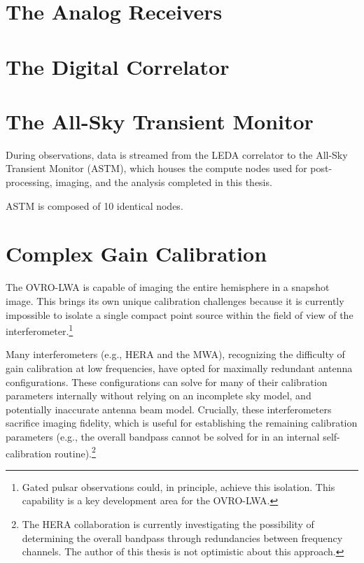 \begin{bibunit}
\section{The Analog Receivers}







\section{The Digital Correlator}



\section{The All-Sky Transient Monitor}

During observations, data is streamed from the LEDA correlator to the All-Sky Transient Monitor
(ASTM), which houses the compute nodes used for post-processing, imaging, and the analysis completed
in this thesis.

ASTM is composed of 10 identical nodes.





\section{Complex Gain Calibration}

The OVRO-LWA is capable of imaging the entire hemisphere in a snapshot image. This brings its own
unique calibration challenges because it is currently impossible to isolate a single compact point source
within the field of view of the interferometer.\footnote{
    Gated pulsar observations could, in principle, achieve this isolation. This capability is a key
    development area for the OVRO-LWA.
}

Many interferometers (e.g., HERA and the MWA), recognizing the difficulty of gain calibration at low
frequencies, have opted for maximally redundant antenna configurations. These configurations can
solve for many of their calibration parameters internally without relying on an incomplete sky
model, and potentially inaccurate antenna beam model. Crucially, these interferometers sacrifice
imaging fidelity, which is useful for establishing the remaining calibration parameters (e.g., the
overall bandpass cannot be solved for in an internal self-calibration routine).\footnote{
    The HERA collaboration is currently investigating the possibility of determining the overall
    bandpass through redundancies between frequency channels. The author of this thesis is not
    optimistic about this approach.
}


\end{bibunit}
